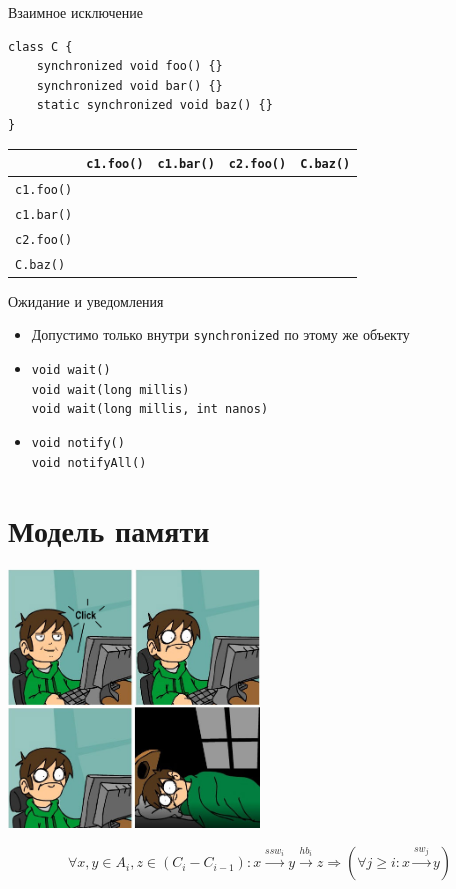 \documentclass[unicode,mathserif]{beamer}
\newcommand{\xmark}{\ding{56}}
\begin{document}
\begin{frame}[fragile]{Взаимное исключение}
\begin{lstlisting}
class C {
    synchronized void foo() {}
    synchronized void bar() {}
    static synchronized void baz() {}
}
\end{lstlisting}
\begin{center}
\begin{tabular}{l|cccc}
    &\lstinline|c1.foo()| &\lstinline|c1.bar()| &\lstinline|c2.foo()| &\lstinline|C.baz()| \\
\hline
\lstinline|c1.foo()|&\xmark &\xmark \\
\lstinline|c1.bar()|&\xmark &\xmark \\
\lstinline|c2.foo()|&       &       &\xmark \\
\lstinline|C.baz()| &       &       &       &\xmark
\end{tabular}
\end{center}
\end{frame}


\begin{frame}{Ожидание и уведомления}
\begin{itemize}
\item Допустимо только внутри \lstinline{synchronized} по этому же объекту
    \bigskip

\item \lstinline|void wait()|\\
    \lstinline|void wait(long millis)|\\
    \lstinline|void wait(long millis, int nanos)|
    \bigskip

\item \lstinline|void notify()|\\
    \lstinline|void notifyAll()|
\end{itemize}
\end{frame}



\section{Модель памяти}

\begin{frame}
\centering
\includegraphics[width=0.5\textwidth]{pics/hardcore.jpg}

$$
\forall x, y \in A_i, z \in (C_i - C_{i-1}):
x\xrightarrow{ssw_i} y \xrightarrow{hb_i} z
\Rightarrow (\forall j \ge i: x \xrightarrow{sw_j} y)
$$
\end{frame}
\end{document}
